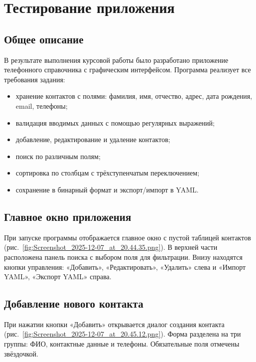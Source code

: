 \section{Тестирование приложения}

\subsection{Общее описание}

В результате выполнения курсовой работы было разработано приложение телефонного справочника с графическим интерфейсом. Программа реализует все требования задания:

\begin{itemize}
    \item хранение контактов с полями: фамилия, имя, отчество, адрес, дата рождения, email, телефоны;
    \item валидация вводимых данных с помощью регулярных выражений;
    \item добавление, редактирование и удаление контактов;
    \item поиск по различным полям;
    \item сортировка по столбцам с трёхступенчатым переключением;
    \item сохранение в бинарный формат и экспорт/импорт в YAML.
\end{itemize}

\subsection{Главное окно приложения}

При запуске программы отображается главное окно с пустой таблицей контактов (рис.~\ref{fig:Screenshot_2025-12-07_at_20.44.35.png}). В верхней части расположена панель поиска с выбором поля для фильтрации. Внизу находятся кнопки управления: «Добавить», «Редактировать», «Удалить» слева и «Импорт YAML», «Экспорт YAML» справа.


\subsection{Добавление нового контакта}

При нажатии кнопки «Добавить» открывается диалог создания контакта (рис.~\ref{fig:Screenshot_2025-12-07_at_20.45.12.png}). Форма разделена на три группы: ФИО, контактные данные и телефоны. Обязательные поля отмечены звёздочкой.

